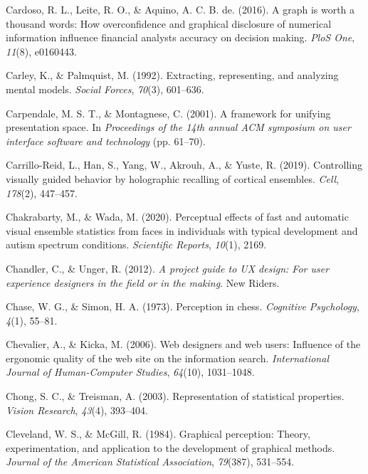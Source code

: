 \documentclass[print]{nuthesis}
\newlength{\cslhangindent}
\newenvironment{CSLReferences}[2]%
{\setlength{\parindent}{0pt}%
\everypar{\setlength{\hangindent}{\cslhangindent}}\ignorespaces}%
{\par}
\begin{document}
\begin{CSLReferences}{1}{0}
\leavevmode{}%
Cardoso, R. L., Leite, R. O., \& Aquino, A. C. B. de. (2016). A graph is worth a thousand words: How overconfidence and graphical disclosure of numerical information influence financial analysts accuracy on decision making. \emph{PloS One}, \emph{11}(8), e0160443.

\leavevmode{}%
Carley, K., \& Palmquist, M. (1992). Extracting, representing, and analyzing mental models. \emph{Social Forces}, \emph{70}(3), 601--636.

\leavevmode{}%
Carpendale, M. S. T., \& Montagnese, C. (2001). A framework for unifying presentation space. In \emph{Proceedings of the 14th annual ACM symposium on user interface software and technology} (pp. 61--70).

\leavevmode{}%
Carrillo-Reid, L., Han, S., Yang, W., Akrouh, A., \& Yuste, R. (2019). Controlling visually guided behavior by holographic recalling of cortical ensembles. \emph{Cell}, \emph{178}(2), 447--457.

\leavevmode{}%
Chakrabarty, M., \& Wada, M. (2020). Perceptual effects of fast and automatic visual ensemble statistics from faces in individuals with typical development and autism spectrum conditions. \emph{Scientific Reports}, \emph{10}(1), 2169.

\leavevmode{}%
Chandler, C., \& Unger, R. (2012). \emph{A project guide to UX design: For user experience designers in the field or in the making}. New Riders.

\leavevmode{}%
Chase, W. G., \& Simon, H. A. (1973). Perception in chess. \emph{Cognitive Psychology}, \emph{4}(1), 55--81.

\leavevmode{}%
Chevalier, A., \& Kicka, M. (2006). Web designers and web users: Influence of the ergonomic quality of the web site on the information search. \emph{International Journal of Human-Computer Studies}, \emph{64}(10), 1031--1048.

\leavevmode{}%
Chong, S. C., \& Treisman, A. (2003). Representation of statistical properties. \emph{Vision Research}, \emph{43}(4), 393--404.

\leavevmode{}%
Cleveland, W. S., \& McGill, R. (1984). Graphical perception: Theory, experimentation, and application to the development of graphical methods. \emph{Journal of the American Statistical Association}, \emph{79}(387), 531--554.


\end{CSLReferences}
\end{document}

